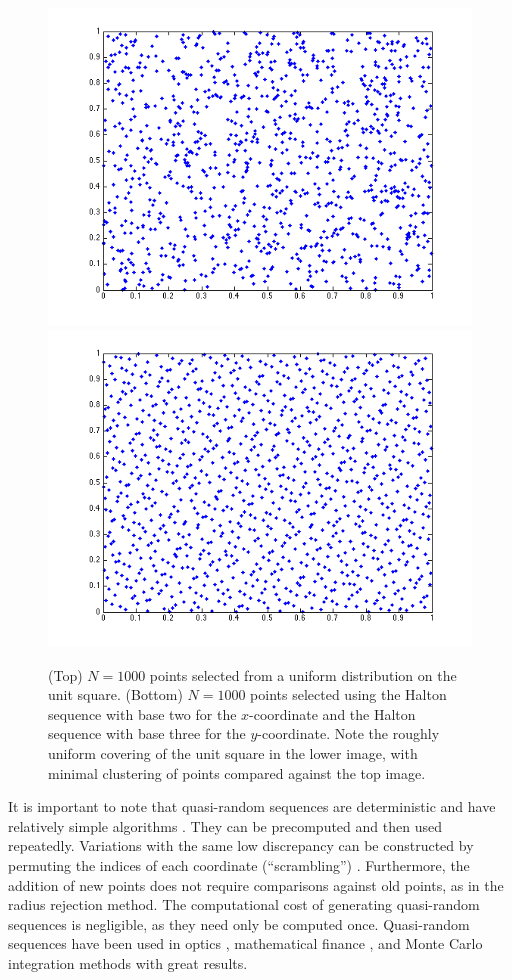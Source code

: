 \documentclass{article}
\begin{document}
\begin{figure}
\center \includegraphics[width=0.8\linewidth]{random.png}\\\includegraphics[width=0.8\linewidth]{halton.png}
\caption{(Top) $N=1000$ points selected from a uniform distribution on the unit square. (Bottom) $N=1000$ points selected using the Halton sequence with base two for the $x$-coordinate and the Halton sequence with base three for the $y$-coordinate. Note the roughly uniform covering of the unit square in the lower image, with minimal clustering of points compared against the top image.}
\label{fig:halton}
\end{figure}

It is important to note that  quasi-random sequences are deterministic and have relatively simple algorithms \cite{dalal2008low}. They can be precomputed and then used repeatedly. Variations with the same low discrepancy can be constructed by permuting the indices of each coordinate (``scrambling'') \cite{mascagni2004scrambled}. Furthermore, the addition of new points does not require comparisons against old points, as in the radius rejection method. The computational cost of generating quasi-random sequences is negligible, as they need only be computed once. Quasi-random sequences have been used in optics \cite{ide2003dot}, mathematical finance \cite{ninomiya1996toward}, and Monte Carlo integration methods \cite{dalal2008low,halton1960efficiency,mascagni2004scrambled,morokoff1994quasi,soboldistribution} with great results. 
\end{document}
